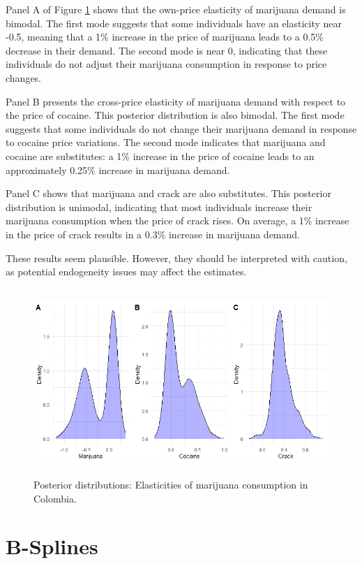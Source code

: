 Panel A of Figure \ref{figElastDrugs} shows that the own-price elasticity of marijuana demand is bimodal. The first mode suggests that some individuals have an elasticity near -0.5, meaning that a 1\% increase in the price of marijuana leads to a 0.5\% decrease in their demand. The second mode is near 0, indicating that these individuals do not adjust their marijuana consumption in response to price changes. 

Panel B presents the cross-price elasticity of marijuana demand with respect to the price of cocaine. This posterior distribution is also bimodal. The first mode suggests that some individuals do not change their marijuana demand in response to cocaine price variations. The second mode indicates that marijuana and cocaine are substitutes: a 1\% increase in the price of cocaine leads to an approximately 0.25\% increase in marijuana demand.

Panel C shows that marijuana and crack are also substitutes. This posterior distribution is unimodal, indicating that most individuals increase their marijuana consumption when the price of crack rises. On average, a 1\% increase in the price of crack results in a 0.3\% increase in marijuana demand.

These results seem plausible. However, they should be interpreted with caution, as potential endogeneity issues may affect the estimates.
 
\begin{figure}[!h]
	\includegraphics[width=340pt, height=200pt]{Chapters/chapter11/figures/ElastDrugs.png}
	\caption[List of figure caption goes here]{Posterior distributions: Elasticities of marijuana consumption in Colombia.}\label{figElastDrugs}
\end{figure}



\section{B-Splines}\label{sec11_2}

